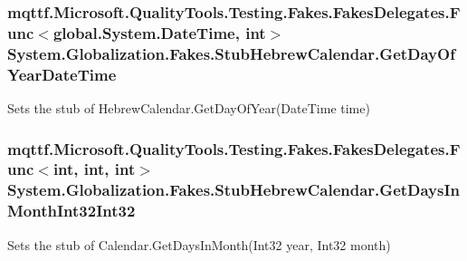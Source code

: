 \hypertarget{class_system_1_1_globalization_1_1_fakes_1_1_stub_hebrew_calendar_a89dbe94bcf22d8e0b6ead10ad9f79547}{
\subsubsection[{Get\-Day\-Of\-Year\-Date\-Time}]{\setlength{\rightskip}{0pt plus 5cm}mqttf.\-Microsoft.\-Quality\-Tools.\-Testing.\-Fakes.\-Fakes\-Delegates.\-Func$<$global.\-System.\-Date\-Time, int$>$ System.\-Globalization.\-Fakes.\-Stub\-Hebrew\-Calendar.\-Get\-Day\-Of\-Year\-Date\-Time}}\label{class_system_1_1_globalization_1_1_fakes_1_1_stub_hebrew_calendar_a89dbe94bcf22d8e0b6ead10ad9f79547}


Sets the stub of Hebrew\-Calendar.\-Get\-Day\-Of\-Year(\-Date\-Time time)

\hypertarget{class_system_1_1_globalization_1_1_fakes_1_1_stub_hebrew_calendar_ab166aa6607da02bb9a5a1a56c2847bab}{
\subsubsection[{Get\-Days\-In\-Month\-Int32\-Int32}]{\setlength{\rightskip}{0pt plus 5cm}mqttf.\-Microsoft.\-Quality\-Tools.\-Testing.\-Fakes.\-Fakes\-Delegates.\-Func$<$int, int, int$>$ System.\-Globalization.\-Fakes.\-Stub\-Hebrew\-Calendar.\-Get\-Days\-In\-Month\-Int32\-Int32}}\label{class_system_1_1_globalization_1_1_fakes_1_1_stub_hebrew_calendar_ab166aa6607da02bb9a5a1a56c2847bab}


Sets the stub of Calendar.\-Get\-Days\-In\-Month(\-Int32 year, Int32 month)

